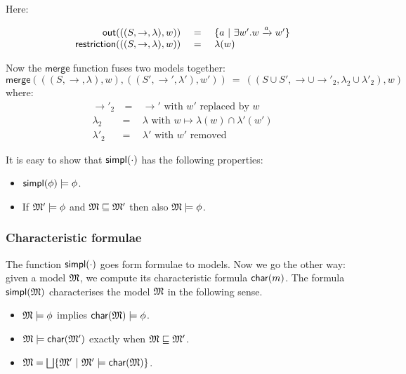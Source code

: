 \NI Here:

\[
\begin{array}{rcl}
  \mathsf{out}(((S,\rightarrow,\lambda),w)) 
     &\ =\ & \{ a \ | \  \exists w' . w \xrightarrow{a} w'\}  \\
  \mathsf{restriction}(((S,\rightarrow,\lambda),w)) 
    & = & 
  \lambda(w) 
\end{array}
\]

\NI Now the $\mathsf{merge}$ function fuses two  models together:
\[
   \mathsf{merge}( ( (S, \rightarrow, \lambda), w),  ( (S', \rightarrow', \lambda'), w')) 
      \ =\ 
   ((S \cup S', \rightarrow \cup \rightarrow'_2, \lambda_2 \cup \lambda'_2), w)
\]
where:
\begin{eqnarray*}
  \rightarrow'_2 &\ =\ & \rightarrow' \mbox{ with } w' \mbox{ replaced by } w  \\
  \lambda_2 & = & \lambda \mbox{ with } w \mapsto \lambda(w) \cap \lambda'(w')  \\
  \lambda'_2 & = & \lambda' \mbox{ with } w' \mbox{ removed } 
\end{eqnarray*}

\NI It is easy to show that $\mathsf{simpl}(\cdot)$ has the following properties:

\begin{itemize}

\item $\mathsf{simpl}(\phi) \models \phi$.

\item If $\frak{M}' \models \phi$ and  $\frak{M} \sqsubseteq \frak{M}'$ then also  $\frak{M} \models \phi$.
 
\end{itemize}

\subsubsection{Characteristic formulae}

The function $\mathsf{simpl}(\cdot)$ goes form formulae to models. Now we go
the other way: given a model $\frak{M}$, we compute its characteristic
formula $\mathsf{char}(m)$. The formula $\mathsf{simpl}(\frak{M})$ characterises the model
$\frak{M}$ in the following sense. 

\begin{itemize}

\item  $\frak{M} \models \phi$ implies $\mathsf{char}(\frak{M}) \models \phi$.

\item  $\frak{M} \models \mathsf{char}( \frak{M}' )$ exactly when $\frak{M} \sqsubseteq \frak{M}'$.

\item $\frak{M} = \bigsqcup \{\frak{M}' \ |\ \frak{M}' \models \mathsf{char}(\frak{M}) \}$.

\end{itemize}


